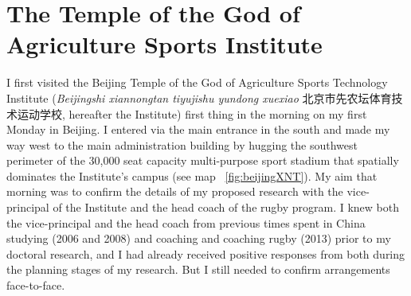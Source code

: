 \section{The Temple of the God of Agriculture Sports Institute}
I first visited the Beijing Temple of the God of Agriculture Sports Technology Institute (\textit{Beijingshi xiannongtan tiyujishu yundong xuexiao} 北京市先农坛体育技术运动学校,
hereafter the Institute) first thing in the morning on my first Monday in Beijing.  I entered via the main entrance in the south and made my way west to the main administration building by hugging the southwest perimeter of the 30,000 seat capacity multi-purpose sport stadium that spatially dominates the Institute's campus (see map ~\ref{fig:beijingXNT}). My aim that morning was to confirm the details of my proposed research with the vice-principal of the Institute and the head coach of the rugby program. I knew both the vice-principal and the head coach from previous times spent in China studying (2006 and 2008) and coaching and coaching rugby (2013) prior to my doctoral research, and I had already received positive responses from both during the planning stages of my research.  But I still needed to confirm arrangements face-to-face.

